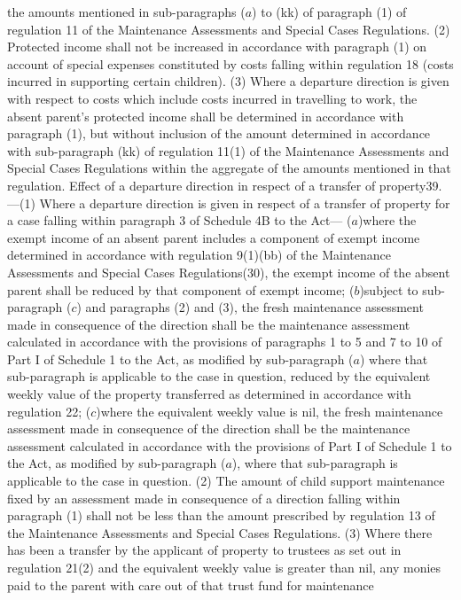 \documentclass[a4paper]{article}
\begin{document}
the amounts mentioned in sub-paragraphs ($a$) to (kk) of paragraph (1) of
regulation 11 of the Maintenance Assessments and Special Cases Regulations.
(2) Protected income shall not be increased in accordance with paragraph (1) on
account of special expenses constituted by costs falling within regulation 18
(costs incurred in supporting certain children).
(3) Where a departure direction is given with respect to costs which include
costs incurred in travelling to work, the absent parent’s protected income shall
be determined in accordance with paragraph (1), but without inclusion of the
amount determined in accordance with sub-paragraph (kk) of regulation 11(1) of
the Maintenance Assessments and Special Cases Regulations within the aggregate
of the amounts mentioned in that regulation.
Effect of a departure direction in respect of a transfer of property39.—(1)
Where a departure direction is given in respect of a transfer of property for a
case falling within paragraph 3 of Schedule 4B to the Act—
($a$)where the exempt income of an absent parent includes a component of exempt
income determined in accordance with regulation 9(1)(bb) of the Maintenance
Assessments and Special Cases Regulations(30), the exempt income of the absent
parent shall be reduced by that component of exempt income;
($b$)subject to sub-paragraph ($c$) and paragraphs (2) and (3), the fresh
maintenance assessment made in consequence of the direction shall be the
maintenance assessment calculated in accordance with the provisions of
paragraphs 1 to 5 and 7 to 10 of Part I of Schedule 1 to the Act, as modified by
sub-paragraph ($a$) where that sub-paragraph is applicable to the case in
question, reduced by the equivalent weekly value of the property transferred as
determined in accordance with regulation 22;
($c$)where the equivalent weekly value is nil, the fresh maintenance assessment
made in consequence of the direction shall be the maintenance assessment
calculated in accordance with the provisions of Part I of Schedule 1 to the Act,
as modified by sub-paragraph ($a$), where that sub-paragraph is applicable to the
case in question.
(2) The amount of child support maintenance fixed by an assessment made in
consequence of a direction falling within paragraph (1) shall not be less than
the amount prescribed by regulation 13 of the Maintenance Assessments and
Special Cases Regulations.
(3) Where there has been a transfer by the applicant of property to trustees as
set out in regulation 21(2) and the equivalent weekly value is greater than nil,
any monies paid to the parent with care out of that trust fund for maintenance
\end{document}
